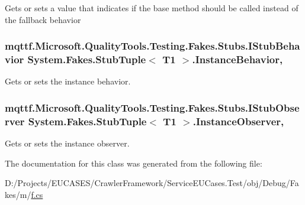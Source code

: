 Gets or sets a value that indicates if the base method should be called instead of the fallback behavior

\hypertarget{class_system_1_1_fakes_1_1_stub_tuple_3_01_t1_01_4_aa88e7bc9352a9e6ca596d243e0070176}{
\subsubsection[{Instance\-Behavior}]{\setlength{\rightskip}{0pt plus 5cm}mqttf.\-Microsoft.\-Quality\-Tools.\-Testing.\-Fakes.\-Stubs.\-I\-Stub\-Behavior System.\-Fakes.\-Stub\-Tuple$<$ T1 $>$.Instance\-Behavior\hspace{0.3cm}{\ttfamily [get]}, {\ttfamily [set]}}}\label{class_system_1_1_fakes_1_1_stub_tuple_3_01_t1_01_4_aa88e7bc9352a9e6ca596d243e0070176}


Gets or sets the instance behavior.

\hypertarget{class_system_1_1_fakes_1_1_stub_tuple_3_01_t1_01_4_a28473ce3c8608ee6eff11e48c333b9aa}{
\subsubsection[{Instance\-Observer}]{\setlength{\rightskip}{0pt plus 5cm}mqttf.\-Microsoft.\-Quality\-Tools.\-Testing.\-Fakes.\-Stubs.\-I\-Stub\-Observer System.\-Fakes.\-Stub\-Tuple$<$ T1 $>$.Instance\-Observer\hspace{0.3cm}{\ttfamily [get]}, {\ttfamily [set]}}}\label{class_system_1_1_fakes_1_1_stub_tuple_3_01_t1_01_4_a28473ce3c8608ee6eff11e48c333b9aa}


Gets or sets the instance observer.



The documentation for this class was generated from the following file\-:\begin{DoxyCompactItemize}
\item 
D\-:/\-Projects/\-E\-U\-C\-A\-S\-E\-S/\-Crawler\-Framework/\-Service\-E\-U\-Cases.\-Test/obj/\-Debug/\-Fakes/m/\hyperlink{m_2f_8cs}{f.\-cs}\end{DoxyCompactItemize}
